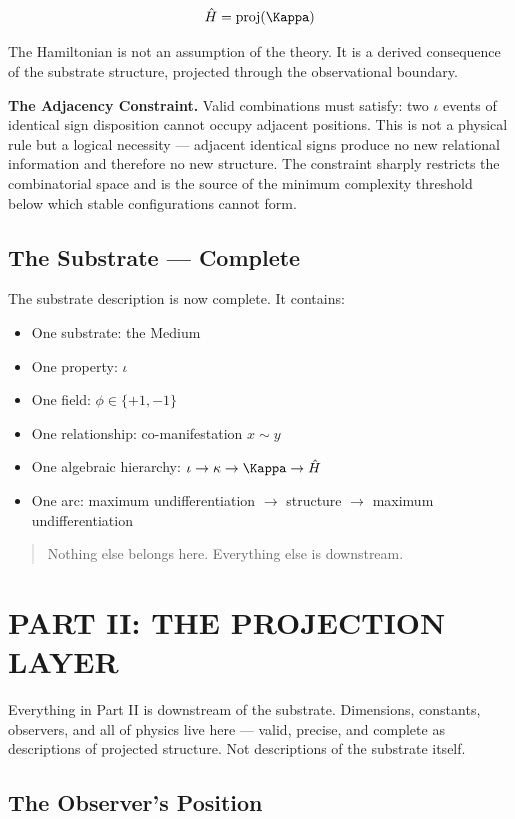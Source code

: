 \documentclass[11pt,letterpaper]{article}
\begin{document}
\begin{equation}
\hat{H} = \mathrm{proj}(\Kappa)
\end{equation}

The Hamiltonian is not an assumption of the theory. It is a derived consequence of the substrate structure, projected through the observational boundary.

\textbf{The Adjacency Constraint.} Valid combinations must satisfy: two \(\iota\) events of identical sign disposition cannot occupy adjacent positions. This is not a physical rule but a logical necessity --- adjacent identical signs produce no new relational information and therefore no new structure. The constraint sharply restricts the combinatorial space and is the source of the minimum complexity threshold below which stable configurations cannot form.
\subsection{The Substrate --- Complete}
\label{sec:org041b5be}

The substrate description is now complete. It contains:

\begin{itemize}
\item One substrate: the Medium
\item One property: \(\iota\)
\item One field: \(\phi \in \{+1, -1\}\)
\item One relationship: co-manifestation \(x \sim y\)
\item One algebraic hierarchy: \(\iota \to \kappa \to \Kappa \to \hat{H}\)
\item One arc: maximum undifferentiation \(\to\) structure \(\to\) maximum undifferentiation
\end{itemize}

\begin{quote}
Nothing else belongs here. Everything else is downstream.
\end{quote}
\section{PART II: THE PROJECTION LAYER}
\label{sec:orgee4b387}

Everything in Part II is downstream of the substrate. Dimensions, constants, observers, and all of physics live here --- valid, precise, and complete as descriptions of projected structure. Not descriptions of the substrate itself.
\subsection{The Observer's Position}
\label{sec:org33a8e1e}
\end{document}
